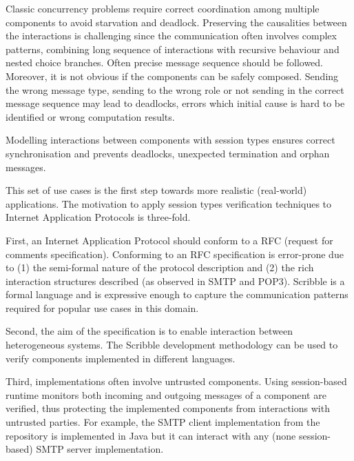 Classic concurrency problems require correct coordination among multiple components to avoid starvation and deadlock. Preserving the causalities between the interactions is challenging since the communication often involves complex patterns, combining long sequence of interactions with recursive behaviour and nested choice branches.
Often precise message sequence should be followed. Moreover, it is not obvious if the components can be safely composed. Sending the wrong message type, sending to the wrong role or not sending in the correct message sequence may lead to deadlocks, errors which initial cause is hard to be identified or wrong computation results.


Modelling interactions between components with session types ensures correct synchronisation and prevents deadlocks, unexpected termination and orphan messages.


This set of use cases is the first step towards more realistic (real-world) applications. The motivation to apply session types verification techniques to Internet Application Protocols is three-fold.

First, an Internet Application Protocol should conform to a RFC (request for comments specification). Conforming to an RFC specification is error-prone due to (1) the semi-formal nature of the protocol description and (2) the rich interaction structures described (as observed in SMTP and POP3). Scribble is a formal language and is expressive enough to capture the communication patterns required for popular use cases in this domain.  

Second, the aim of the specification is to enable interaction between heterogeneous systems. The Scribble development methodology can be used to verify components implemented in different languages. 

Third, implementations often involve untrusted components. Using session-based runtime monitors both incoming and outgoing messages of a component are verified, thus protecting the implemented components from interactions with untrusted parties. For example, the SMTP client implementation from the repository is implemented in Java but it can interact with any (none session-based) SMTP server implementation.

